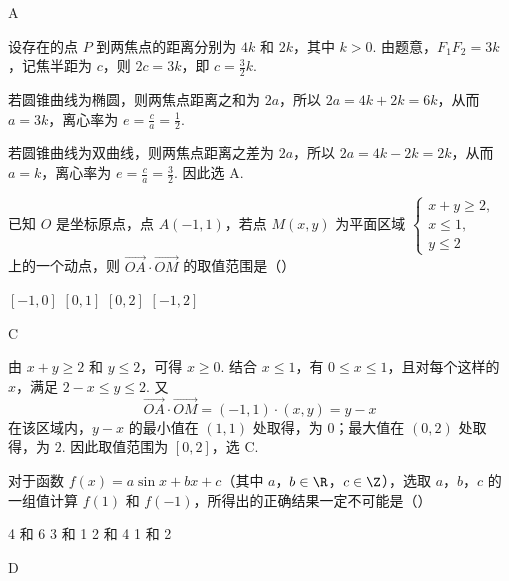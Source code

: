 \begin{answer}
A
\end{answer}

\begin{solution}
设存在的点 \(P\) 到两焦点的距离分别为 \(4k\) 和 \(2k\)，其中 \(k>0\). 由题意，\(F_1F_2=3k\)，记焦半距为 \(c\)，则 \(2c=3k\)，即 \(c=\frac{3}{2}k\).

若圆锥曲线为椭圆，则两焦点距离之和为 \(2a\)，所以 \(2a=4k+2k=6k\)，从而 \(a=3k\)，离心率为 \(e=\frac{c}{a}=\frac{1}{2}\).

若圆锥曲线为双曲线，则两焦点距离之差为 \(2a\)，所以 \(2a=4k-2k=2k\)，从而 \(a=k\)，离心率为 \(e=\frac{c}{a}=\frac{3}{2}\). 因此选 A.
\end{solution}

\begin{problem}
已知 \(O\) 是坐标原点，点 \(A(-1,1)\)，若点 \(M(x,y)\) 为平面区域 \(\begin{cases}
x+y\geqslant 2,\\
x\leqslant 1,\\
y\leqslant 2
\end{cases}\) 上的一个动点，则 \(\overrightarrow{OA}\cdot\overrightarrow{OM}\) 的取值范围是（\quad）

\choices
    {\([-1,0]\)}
    {\([0,1]\)}
    {\([0,2]\)}
    {\([-1,2]\)}
\end{problem}

\begin{answer}
C
\end{answer}

\begin{solution}
由 \(x+y\geqslant2\) 和 \(y\leqslant2\)，可得 \(x\geqslant0\). 结合 \(x\leqslant1\)，有 \(0\leqslant x\leqslant1\)，且对每个这样的 \(x\)，满足 \(2-x\leqslant y\leqslant2\). 又
\[
\overrightarrow{OA}\cdot\overrightarrow{OM}=(-1,1)\cdot(x,y)=y-x
\]
在该区域内，\(y-x\) 的最小值在 \((1,1)\) 处取得，为 \(0\)；最大值在 \((0,2)\) 处取得，为 \(2\). 因此取值范围为 \([0,2]\)，选 C.
\end{solution}

\begin{problem}
对于函数 \(f(x)=a\sin x+bx+c\)（其中 \(a\)，\(b\in\R\)，\(c\in\Z\)），选取 \(a\)，\(b\)，\(c\) 的一组值计算 \(f(1)\) 和 \(f(-1)\)，所得出的正确结果一定不可能是（\quad）

\choices
    {4 和 6}
    {3 和 1}
    {2 和 4}
    {1 和 2}
\end{problem}

\begin{answer}
D
\end{answer}

